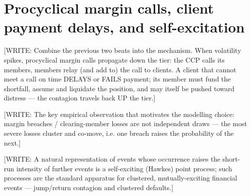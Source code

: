 \section{Procyclical margin calls, client payment delays, and self-excitation}
\label{sec:intro-paymentdelays}


[WRITE: Combine the previous two beats into the mechanism. When volatility spikes,
procyclical margin calls propagate down the tier: the CCP calls its members, members
relay (and add to) the call to clients. A client that cannot meet a call on time
DELAYS or FAILS payment; its member must fund the shortfall, assume and liquidate
the position, and may itself be pushed toward distress — the contagion travels back
UP the tier.] \citep{cont_2017,brunnermeier_pedersen_2009}

[WRITE: The key empirical observation that motivates the modelling choice: margin
breaches / clearing-member losses are not independent draws — the most severe losses
cluster and co-move, i.e. one breach raises the probability of the next.]
\citep{jones_perignon_2013,huang_menkveld_yu_2021}

[WRITE: A natural representation of events whose occurrence raises the short-run
intensity of further events is a self-exciting (Hawkes) point process; such
processes are the standard apparatus for clustered, mutually-exciting financial
events — jump/return contagion and clustered defaults.]
\citep{hawkes_1971,aitsahalia_2015,errais_2010}

